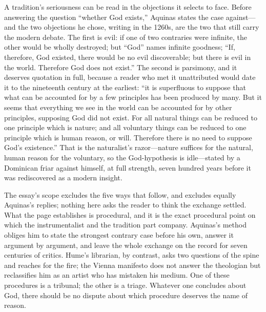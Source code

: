 A tradition's seriousness can be read in the objections it selects to face. Before answering the question ``whether God exists,'' Aquinas states the case against---and the two objections he chose, writing in the 1260s, are the two that still carry the modern debate. The first is evil: if one of two contraries were infinite, the other would be wholly destroyed; but ``God'' names infinite goodness; ``If, therefore, God existed, there would be no evil discoverable; but there is evil in the world. Therefore God does not exist.'' The second is parsimony, and it deserves quotation in full, because a reader who met it unattributed would date it to the nineteenth century at the earliest: ``it is superfluous to suppose that what can be accounted for by a few principles has been produced by many. But it seems that everything we see in the world can be accounted for by other principles, supposing God did not exist. For all natural things can be reduced to one principle which is nature; and all voluntary things can be reduced to one principle which is human reason, or will. Therefore there is no need to suppose God's existence.'' That is the naturalist's razor---nature suffices for the natural, human reason for the voluntary, so the God-hypothesis is idle---stated by a Dominican friar against himself, at full strength, seven hundred years before it was rediscovered as a modern insight.

The essay's scope excludes the five ways that follow, and excludes equally Aquinas's replies; nothing here asks the reader to think the exchange settled. What the page establishes is procedural, and it is the exact procedural point on which the instrumentalist and the tradition part company. Aquinas's method obliges him to state the strongest contrary case before his own, answer it argument by argument, and leave the whole exchange on the record for seven centuries of critics. Hume's librarian, by contrast, asks two questions of the spine and reaches for the fire; the Vienna manifesto does not answer the theologian but reclassifies him as an artist who has mistaken his medium. One of these procedures is a tribunal; the other is a triage. Whatever one concludes about God, there should be no dispute about which procedure deserves the name of reason.

